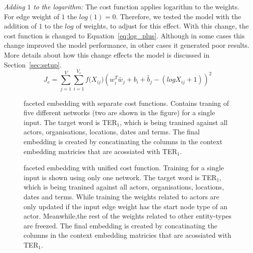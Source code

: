 \emph{Adding $1$ to the logarithm:} The cost function applies logarithm to the weights. For edge weight of $1$ the $log(1)=0$. Therefore, we tested the model with the addition of $1$ to the $log$ of weights, to adjust for this effect. With this change, the cost function is changed to Equation~\ref{eq:log_plus}. Although in some cases this change improved the model performance, in other cases it generated poor results. More details about how this change effects the model is discussed in Section~\ref{sec:setup}. 
\begin{equation}
J_e=\sum _{ j=1 }^{ V }{}\sum _{ i=1 }^{ V_e }{ f({ X }_{ ij } } )(w_{ i }^{ T }\tilde{  w_{ j } } +b_{ i }+\tilde{  b_{ j } } -(log{ X }_{ ij }+1))^2
\label{eq:log_plus}
\end{equation}
\begin{figure}
{\small 
{} %

}
\caption{faceted embedding with separate cost functions. Contains traning of five different networks (two are shown in the figure) for a single input. The target word is TER$_1$, which is being tranined against all actors, organisations, locations, dates and terms. The final embedding is created by concatinating the columns in the context embedding matricies that are acossiated with TER$_1$.   } \label{fig:separate_cost}
\end{figure}
\begin{figure}
{\small 
{} %

\caption{faceted embedding with unified cost function. Training for a single input is shown using only one network. The target word is TER$_1$, which is being tranined against all actors, organisations, locations, dates and terms. While training the weights related to actors are only updated if the input edge weight has the start node type of an actor. Meanwhile,the rest of the weights related to other entity-types are freezed. The final embedding is created by concatinating the columns in the context embedding matricies that are acossiated with TER$_1$.} \label{fig:unified_cost}
}
\end{figure}
